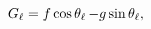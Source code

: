 $\mathop{G_{\ell}\/}\nolimits=f\mathop{\cos\/}\nolimits\mathop{{\theta_{\ell}}%
\/}\nolimits-g\mathop{\sin\/}\nolimits\mathop{{\theta_{\ell}}\/}\nolimits,$